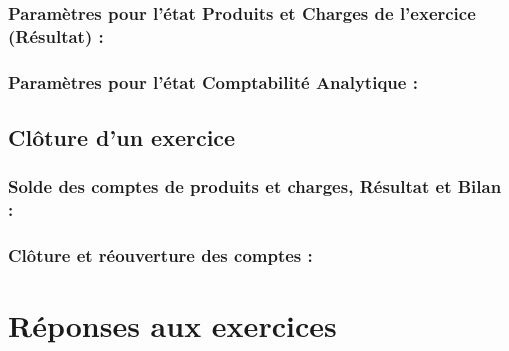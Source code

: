 	
\subsubsection {Paramètres pour l'état Produits et Charges de l'exercice (Résultat) :}		
			

\subsubsection {Paramètres pour l'état Comptabilité Analytique :}
		

\subsection {Clôture d'un exercice\label{association-plan-closingResult}}


\subsubsection {Solde des comptes de produits et charges, Résultat et Bilan :}


\subsubsection {Clôture et réouverture des comptes :}


\section {Réponses aux exercices} \label{association-answer}




	
	
	
	
	

